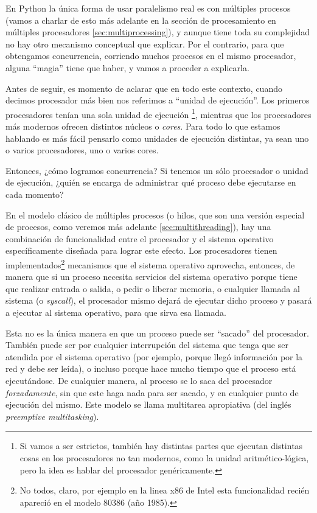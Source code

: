 En Python la única forma de usar paralelismo real es con múltiples procesos (vamos a charlar de esto más adelante en la sección de procesamiento en múltiples procesadores \ref{sec:multiprocessing}), y aunque tiene toda su complejidad no hay otro mecanismo conceptual que explicar. Por el contrario, para que obtengamos concurrencia, corriendo muchos procesos en el mismo procesador, alguna ``magia'' tiene que haber, y vamos a proceder a explicarla.

\begin{info}
Antes de seguir, es momento de aclarar que en todo este contexto, cuando decimos procesador más bien nos referimos a ``unidad de ejecución''. Los primeros procesadores tenían una sola unidad de ejecución \footnote{Si vamos a ser estrictos, también hay distintas partes que ejecutan distintas cosas en los procesadores no tan modernos, como la unidad aritmético-lógica, pero la idea es hablar del procesador genéricamente.}, mientras que los procesadores más modernos ofrecen distintos núcleos o \textit{cores}. Para todo lo que estamos hablando es más fácil pensarlo como unidades de ejecución distintas, ya sean uno o varios procesadores, uno o varios cores.
\end{info}

Entonces, ¿cómo logramos concurrencia? Si tenemos un sólo procesador o unidad de ejecución, ¿quién se encarga de administrar qué proceso debe ejecutarse en cada momento?

En el modelo clásico de múltiples procesos (o hilos, que son una versión especial de procesos, como veremos más adelante \ref{sec:multithreading}), hay una combinación de funcionalidad entre el procesador y el sistema operativo específicamente diseñada para lograr este efecto. Los procesadores tienen implementados\footnote{No todos, claro, por ejemplo en la linea x86 de Intel esta funcionalidad recién apareció en el modelo 80386 (año 1985).} mecanismos que el sistema operativo aprovecha, entonces, de manera que si un proceso necesita servicios del sistema operativo porque tiene que realizar entrada o salida, o pedir o liberar memoria, o cualquier llamada al sistema (o \textit{syscall}), el procesador mismo dejará de ejecutar dicho proceso y pasará a ejecutar al sistema operativo, para que sirva esa llamada.

Esta no es la única manera en que un proceso puede ser ``sacado'' del procesador. También puede ser por cualquier interrupción del sistema que tenga que ser atendida por el sistema operativo (por ejemplo, porque llegó información por la red y debe ser leída), o incluso porque hace mucho tiempo que el proceso está ejecutándose. De cualquier manera, al proceso se lo saca del procesador \textit{forzadamente}, sin que este haga nada para ser sacado, y en cualquier punto de ejecución del mismo. Este modelo se llama multitarea apropiativa (del inglés \textit{preemptive multitasking}).

